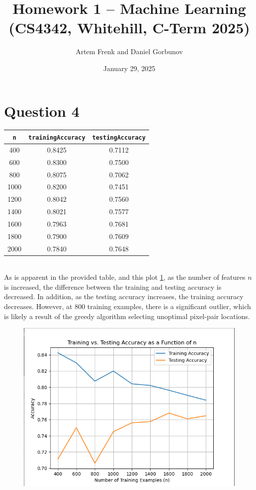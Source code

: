 \documentclass{article}
\title{Homework 1 – Machine Learning (CS4342, Whitehill, C-Term 2025)}
\author{Artem Frenk and Daniel Gorbunov}
\date{January 29, 2025}
\begin{document}
\maketitle

\section{Question 4}
\begin{tabular}{|c|c|c|}
     \hline
     \texttt{n} & \texttt{trainingAccuracy} &\texttt{testingAccuracy}\\
     \hline
     400 & 0.8425 & 0.7112\\
     \hline
     600 & 0.8300 & 0.7500\\
     \hline 
     800 & 0.8075 & 0.7062\\
     \hline 
     1000 & 0.8200 & 0.7451\\
     \hline 
     1200 & 0.8042 & 0.7560\\
     \hline 
     1400 & 0.8021 & 0.7577\\
     \hline
     1600 & 0.7963 & 0.7681 \\
     \hline
     1800 & 0.7900 & 0.7609\\
     \hline 
     2000 & 0.7840 & 0.7648\\
     \hline 
     
\end{tabular} \\

As is apparent in the provided table, and this plot \ref{fig:convergence}, as the number of features $n$ is increased, the difference between the training and testing accuracy is decreased.  In addition, as the testing accuracy increases, the training accuracy decreases. However, at 800 training examples, there is a significant outlier, which is likely a result of the greedy algorithm selecting unoptimal pixel-pair locations. 
\begin{figure}
    \centering
    \includegraphics[width=1\linewidth]{Convergence.png}
    \label{fig:convergence}
\end{figure}
\end{document}
